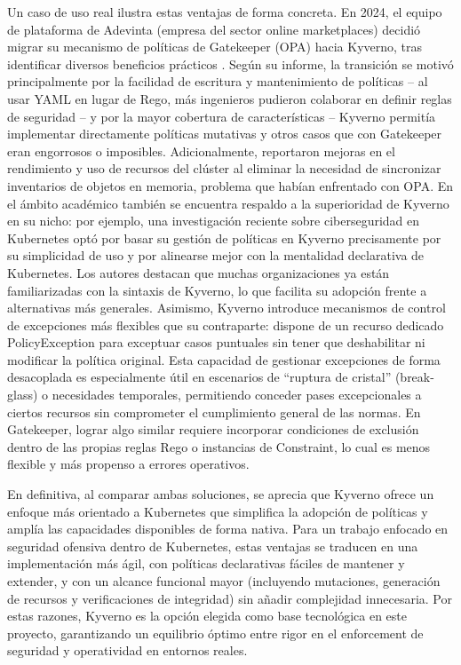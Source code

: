 \documentclass[12pt,twoside,titlepage]{report}
\begin{document}
Un caso de uso real ilustra estas ventajas de forma concreta. En 2024, el equipo de plataforma de Adevinta (empresa del sector online marketplaces) decidió migrar su mecanismo de políticas de Gatekeeper (OPA) hacia Kyverno, tras identificar diversos beneficios prácticos \cite{adevinta2024}. Según su informe, la transición se motivó principalmente por la facilidad de escritura y mantenimiento de políticas – al usar YAML en lugar de Rego, más ingenieros pudieron colaborar en definir reglas de seguridad – y por la mayor cobertura de características – Kyverno permitía implementar directamente políticas mutativas y otros casos que con Gatekeeper eran engorrosos o imposibles. Adicionalmente, reportaron mejoras en el rendimiento y uso de recursos del clúster al eliminar la necesidad de sincronizar inventarios de objetos en memoria, problema que habían enfrentado con OPA. En el ámbito académico también se encuentra respaldo a la superioridad de Kyverno en su nicho: por ejemplo, una investigación reciente sobre ciberseguridad en Kubernetes optó por basar su gestión de políticas en Kyverno precisamente por su simplicidad de uso y por alinearse mejor con la mentalidad declarativa de Kubernetes. Los autores destacan que muchas organizaciones ya están familiarizadas con la sintaxis de Kyverno, lo que facilita su adopción frente a alternativas más generales. Asimismo, Kyverno introduce mecanismos de control de excepciones más flexibles que su contraparte: dispone de un recurso dedicado PolicyException para exceptuar casos puntuales sin tener que deshabilitar ni modificar la política original. Esta capacidad de gestionar excepciones de forma desacoplada es especialmente útil en escenarios de “ruptura de cristal” (break-glass) o necesidades temporales, permitiendo conceder pases excepcionales a ciertos recursos sin comprometer el cumplimiento general de las normas. En Gatekeeper, lograr algo similar requiere incorporar condiciones de exclusión dentro de las propias reglas Rego o instancias de Constraint, lo cual es menos flexible y más propenso a errores operativos.

En definitiva, al comparar ambas soluciones, se aprecia que Kyverno ofrece un enfoque más orientado a Kubernetes que simplifica la adopción de políticas y amplía las capacidades disponibles de forma nativa. Para un trabajo enfocado en seguridad ofensiva dentro de Kubernetes, estas ventajas se traducen en una implementación más ágil, con políticas declarativas fáciles de mantener y extender, y con un alcance funcional mayor (incluyendo mutaciones, generación de recursos y verificaciones de integridad) sin añadir complejidad innecesaria. Por estas razones, Kyverno es la opción elegida como base tecnológica en este proyecto, garantizando un equilibrio óptimo entre rigor en el enforcement de seguridad y operatividad en entornos reales.
\end{document}

